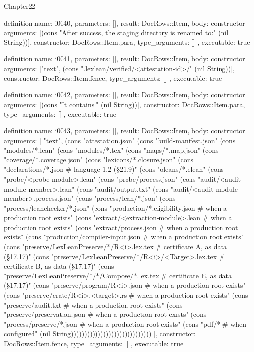 \begin{lexlean}{Chapter22}
\begin{semanticmodule}
definition{
  name: i0040,
  parameters: [],
  result: DocRows::Item,
  body: constructor{
    arguments: [(cons "After success, the staging directory is renamed to:" (nil String))],
    constructor: DocRows::Item.para,
    type_arguments: []
  },
  executable: true
}

definition{
  name: i0041,
  parameters: [],
  result: DocRows::Item,
  body: constructor{
    arguments: ["text", (cons ".lexlean/verified/<attestation-id>/" (nil String))],
    constructor: DocRows::Item.fence,
    type_arguments: []
  },
  executable: true
}

definition{
  name: i0042,
  parameters: [],
  result: DocRows::Item,
  body: constructor{
    arguments: [(cons "It contains:" (nil String))],
    constructor: DocRows::Item.para,
    type_arguments: []
  },
  executable: true
}

definition{
  name: i0043,
  parameters: [],
  result: DocRows::Item,
  body: constructor{
    arguments: [
      "text",
      (cons "attestation.json" (cons "build-manifest.json" (cons "modules/*.lean" (cons "modules/*.tex" (cons "maps/*.map.json" (cons "coverage/*.coverage.json" (cons "lexicons/*.closure.json" (cons "declarations/*.json                       # language 1.2 (§21.9)" (cons "oleans/*.olean" (cons "probe/<probe-module>.lean" (cons "probe/process.json" (cons "audit/<audit-module-member>.lean" (cons "audit/output.txt" (cons "audit/<audit-module-member>.process.json" (cons "process/lean/*.json" (cons "process/leanchecker/*.json" (cons "production/*.eligibility.json              # when a production root exists" (cons "extract/<extraction-module>.lean           # when a production root exists" (cons "extract/process.json                       # when a production root exists" (cons "production/compiler-input.json             # when a production root exists" (cons "preserve/LexLeanPreserve/*/R<i>.lex.tex    # certificate A, as data (§17.17)" (cons "preserve/LexLeanPreserve/*/R<i>/<Target>.lex.tex  # certificate B, as data (§17.17)" (cons "preserve/LexLeanPreserve/*/*/Compose/*.lex.tex  # certificate E, as data (§17.17)" (cons "preserve/program/R<i>.json                 # when a production root exists" (cons "preserve/crate/R<i>.<target>.rs            # when a production root exists" (cons "preserve/audit.txt                         # when a production root exists" (cons "preserve/preservation.json                 # when a production root exists" (cons "process/preserve/*.json                    # when a production root exists" (cons "pdf/*                                      # when configured" (nil String))))))))))))))))))))))))))))))
    ],
    constructor: DocRows::Item.fence,
    type_arguments: []
  },
  executable: true
}


\end{semanticmodule}
\end{lexlean}
